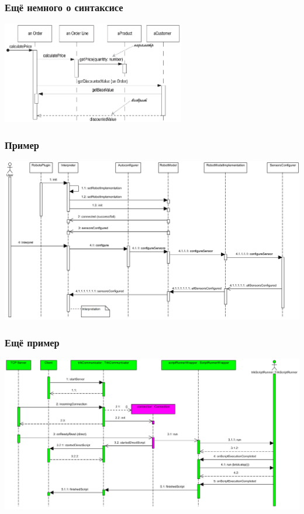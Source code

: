 \documentclass{../../slides-style}
\begin{document}
    \begin{frame}
        \frametitle{Ещё немного о синтаксисе}
        \begin{center}
            \includegraphics[width=0.6\textwidth]{sequenceDiagramSyntax2.png}
        \end{center}
    \end{frame}

    \begin{frame}
        \frametitle{Пример}
        \begin{center}
            \includegraphics[width=\textwidth]{sequenceDiagramExample.png}
        \end{center}
    \end{frame}

    \begin{frame}
        \frametitle{Ещё пример}
        \begin{center}
            \includegraphics[width=\textwidth]{sequenceDiagramExample2.png}
        \end{center}
    \end{frame}
\end{document}
